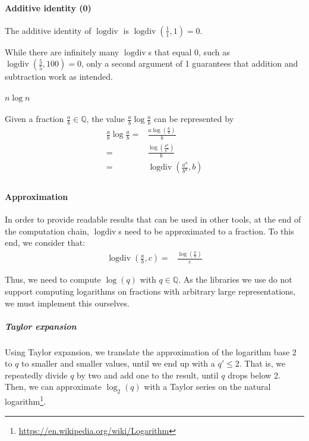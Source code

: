 \documentclass{article}
\DeclareMathOperator{\logdiv}{logdiv}
\begin{document}
            \paragraph{Additive identity (0)}
                The additive identity of $\logdiv$ is $\logdiv(\frac{1}{1}, 1) = 0$.
                
                While there are infinitely many $\logdiv$s that equal 0, such as $\logdiv(\frac{5}{5}, 100) = 0$, only a second argument of 1 guarantees that addition and subtraction work as intended.
                
            \paragraph{$n \log n$}
                Given a fraction $\frac{a}{b} \in \mathbb{Q}$, the value $\frac{a}{b} \log \frac{a}{b}$ can be represented by
                \begin{align*}
                    \frac{a}{b} \log \frac{a}{b} ={} & 
                    \frac{a \log(\frac{a}{b})}{b}\\
                    {}={}& \frac{\log(\frac{a^a}{b^a})}{b}\\
                    {}={}& \logdiv(\frac{a^a}{b^a}, b)\\
                \end{align*}

            \paragraph{Approximation}
                In order to provide readable results that can be used in other tools, at the end of the computation chain, $\logdiv$s need to be approximated to a fraction.
                To this end, we consider that:
                \begin{align*}
                    \logdiv(\frac{a}{b}, c) ={}& \frac{\log(\frac{a}{b})}{c}
                \end{align*}
    
                Thus, we need to compute $\log(q)$ with $q \in \mathbb{Q}$.
                As the libraries we use do not support computing logarithms on fractions with arbitrary large representations, we must implement this ourselves.

                \subparagraph{Taylor expansion}
                    Using Taylor expansion, we translate the approximation of the logarithm base 2 to $q$ to smaller and smaller values, until we end up with a $q' \leq 2$.
                    That is, we repeatedly divide $q$ by two and add one to the result, until $q$ drops below 2.
                    Then, we can approximate $\log_2(q)$ with a Taylor series on the natural logarithm\footnote{\url{https://en.wikipedia.org/wiki/Logarithm}}.
                    
\end{document}
